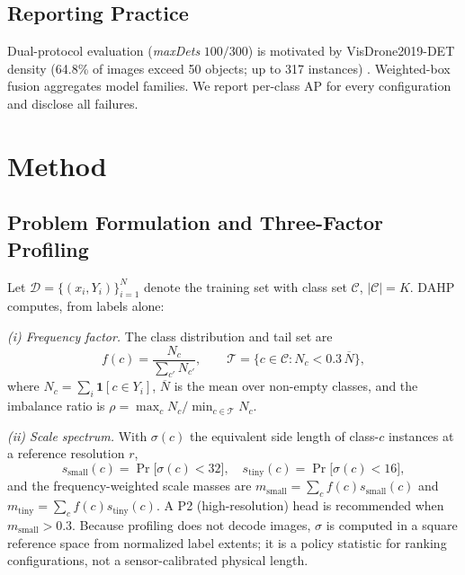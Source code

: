 \documentclass[journal]{IEEEtran}
\newcommand{\ap}{\ensuremath{\mathrm{AP}}}
\newcommand{\visdrone}{VisDrone2019-DET}
\begin{document}
\subsection{Reporting Practice}
Dual-protocol evaluation (\emph{maxDets} $100/300$) is motivated by \visdrone{} density (64.8\% of images exceed 50 objects; up to 317 instances) \cite{visdrone}. Weighted-box fusion \cite{wbf} aggregates model families. We report per-class \ap{} for every configuration and disclose all failures.

\section{Method}
\label{sec:method}
\subsection{Problem Formulation and Three-Factor Profiling}
Let $\mathcal{D}=\{(x_i,Y_i)\}_{i=1}^{N}$ denote the training set with class set $\mathcal{C}$, $|\mathcal{C}|=K$. DAHP computes, from labels alone:

\emph{(i) Frequency factor.} The class distribution and tail set are
\begin{equation}
f(c)=\frac{N_c}{\sum_{c'} N_{c'}},\qquad
\mathcal{T}=\{c\in\mathcal{C}: N_c < 0.3\,\overline{N}\},
\label{eq:tail}
\end{equation}
where $N_c=\sum_i\mathbf{1}[c\in Y_i]$, $\overline{N}$ is the mean over non-empty classes, and the imbalance ratio is $\rho=\max_c N_c/\min_{c\in\mathcal{T}}N_c$.

\emph{(ii) Scale spectrum.} With $\sigma(c)$ the equivalent side length of class-$c$ instances at a reference resolution $r$,
\begin{equation}
s_{\mathrm{small}}(c)=\Pr\big[\sigma(c)<32\big],\quad
s_{\mathrm{tiny}}(c)=\Pr\big[\sigma(c)<16\big],
\label{eq:scale}
\end{equation}
and the frequency-weighted scale masses are $m_{\mathrm{small}}=\sum_c f(c)s_{\mathrm{small}}(c)$ and $m_{\mathrm{tiny}}=\sum_c f(c)s_{\mathrm{tiny}}(c)$. A P2 (high-resolution) head is recommended when $m_{\mathrm{small}}>0.3$.
Because profiling does not decode images, $\sigma$ is computed in a square
reference space from normalized label extents; it is a policy statistic for
ranking configurations, not a sensor-calibrated physical length.
\end{document}
